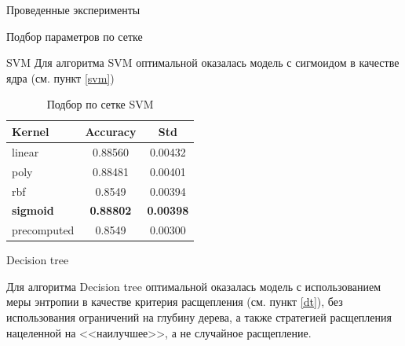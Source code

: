 \begin{section}{Проведенные эксперименты}
\begin{subsection}{Подбор параметров по сетке}
\begin{subsubsection}{SVM}
Для алгоритма SVM оптимальной оказалась модель с сигмоидом в качестве ядра (см. пункт \ref{svm})
  \begin{table}[H]
  \centering
  {\begin{tabular}{|l|c|c|}
  \hline
  \textbf{Kernel} & \textbf{Accuracy} & \textbf{Std} \\
  \hline
  linear & 0.88560 & 0.00432 \\
  \hline
  poly & 0.88481 & 0.00401 \\
  \hline
  rbf & 0.8549 & 0.00394 \\
  \hline
  \textbf{sigmoid} & \textbf{0.88802} & \textbf{0.00398} \\
  \hline
  precomputed & 0.8549 & 0.00300 \\
  \hline
  \end{tabular}}

  \caption{Подбор по сетке SVM}
  \label{grid:svm}
  \end{table}

\end{subsubsection}

\begin{subsubsection}{Decision tree}

Для алгоритма Decision tree оптимальной оказалась модель с использованием меры энтропии в качестве критерия расщепления (см. пункт \ref{dt}), без использования ограничений на глубину дерева, а также стратегией расщепления нацеленной на <<наилучшее>>, а не случайное расщепление.



\end{subsubsection}
\end{subsection}
\end{section}
